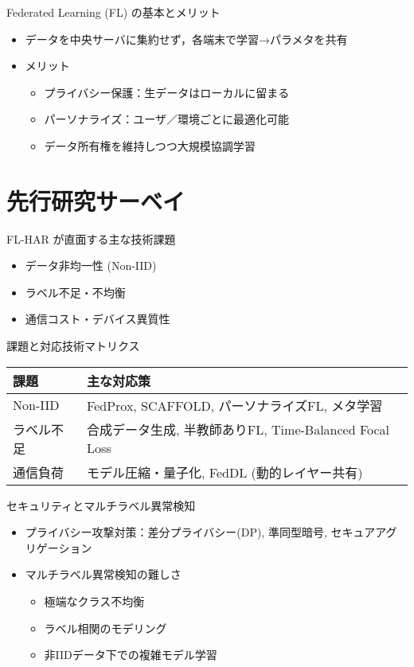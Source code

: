 \documentclass[unicode,12pt,aspectratio=169,dvipdfmx]{beamer}
\begin{document}
\begin{frame}{Federated Learning (FL) の基本とメリット}
  \begin{itemize}
    \item データを中央サーバに集約せず，各端末で学習→パラメタを共有
    \item メリット
    \begin{itemize}
      \item プライバシー保護：生データはローカルに留まる
      \item パーソナライズ：ユーザ／環境ごとに最適化可能
      \item データ所有権を維持しつつ大規模協調学習
    \end{itemize}
  \end{itemize}
\end{frame}

\section{先行研究サーベイ}

\begin{frame}{FL-HAR が直面する主な技術課題}
  \begin{itemize}
    \item データ非均一性 (Non-IID)
    \item ラベル不足・不均衡
    \item 通信コスト・デバイス異質性
  \end{itemize}
\end{frame}

\begin{frame}{課題と対応技術マトリクス}
  \begin{tabular}{p{}p{}}
    \hline
    課題 & 主な対応策 \\
    \hline
    Non-IID & FedProx, SCAFFOLD, パーソナライズFL, メタ学習 \\
    ラベル不足 & 合成データ生成, 半教師ありFL, Time-Balanced Focal Loss \\
    通信負荷 & モデル圧縮・量子化, FedDL (動的レイヤー共有) \\
    \hline
  \end{tabular}
\end{frame}

\begin{frame}{セキュリティとマルチラベル異常検知}
  \begin{itemize}
    \item プライバシー攻撃対策：差分プライバシー(DP), 準同型暗号, セキュアアグリゲーション
    \item マルチラベル異常検知の難しさ
    \begin{itemize}
      \item 極端なクラス不均衡
      \item ラベル相関のモデリング
      \item 非IIDデータ下での複雑モデル学習
    \end{itemize}
  \end{itemize}
\end{frame}
\end{document}
